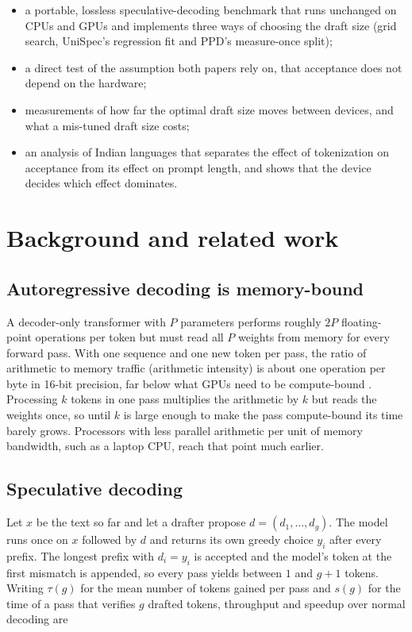\documentclass[11pt,a4paper]{article}
\begin{document}
\begin{itemize}
  \item a portable, lossless speculative-decoding benchmark that runs unchanged on CPUs and GPUs and implements three ways of choosing the draft size (grid search, UniSpec's regression fit and PPD's measure-once split);
  \item a direct test of the assumption both papers rely on, that acceptance does not depend on the hardware;
  \item measurements of how far the optimal draft size moves between devices, and what a mis-tuned draft size costs;
  \item an analysis of Indian languages that separates the effect of tokenization on acceptance from its effect on prompt length, and shows that the device decides which effect dominates.
\end{itemize}
\section{Background and related work}
\subsection{Autoregressive decoding is memory-bound}
A decoder-only transformer with $P$ parameters performs roughly $2P$ floating-point operations per token but must read all $P$ weights from memory for every forward pass. With one sequence and one new token per pass, the ratio of arithmetic to memory traffic (arithmetic intensity) is about one operation per byte in 16-bit precision, far below what GPUs need to be compute-bound \cite{roofline}. Processing $k$ tokens in one pass multiplies the arithmetic by $k$ but reads the weights once, so until $k$ is large enough to make the pass compute-bound its time barely grows. Processors with less parallel arithmetic per unit of memory bandwidth, such as a laptop CPU, reach that point much earlier.

\subsection{Speculative decoding}
Let $x$ be the text so far and let a drafter propose $d = (d_1, \ldots, d_g)$. The model runs once on $x$ followed by $d$ and returns its own greedy choice $y_i$ after every prefix. The longest prefix with $d_i = y_i$ is accepted and the model's token at the first mismatch is appended, so every pass yields between $1$ and $g+1$ tokens. Writing $\tau(g)$ for the mean number of tokens gained per pass and $s(g)$ for the time of a pass that verifies $g$ drafted tokens, throughput and speedup over normal decoding are
\end{document}
